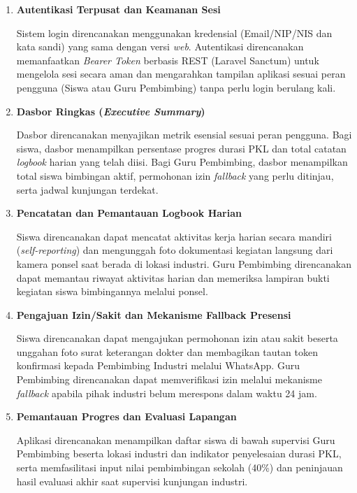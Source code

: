 \begin{enumerate}[label=\alph*.]
\item \textbf{Autentikasi Terpusat dan Keamanan Sesi}
\par\noindent Sistem login direncanakan menggunakan kredensial (Email/NIP/NIS dan kata sandi) yang sama dengan versi \textit{web}. Autentikasi direncanakan memanfaatkan \textit{Bearer Token} berbasis REST (Laravel Sanctum) untuk mengelola sesi secara aman dan mengarahkan tampilan aplikasi sesuai peran pengguna (Siswa atau Guru Pembimbing) tanpa perlu login berulang kali.
\item \textbf{Dasbor Ringkas (\textit{Executive Summary})}
\par\noindent Dasbor direncanakan menyajikan metrik esensial sesuai peran pengguna. Bagi siswa, dasbor menampilkan persentase progres durasi PKL dan total catatan \textit{logbook} harian yang telah diisi. Bagi Guru Pembimbing, dasbor menampilkan total siswa bimbingan aktif, permohonan izin \textit{fallback} yang perlu ditinjau, serta jadwal kunjungan terdekat.
\item \textbf{Pencatatan dan Pemantauan Logbook Harian}
\par\noindent Siswa direncanakan dapat mencatat aktivitas kerja harian secara mandiri (\textit{self-reporting}) dan mengunggah foto dokumentasi kegiatan langsung dari kamera ponsel saat berada di lokasi industri. Guru Pembimbing direncanakan dapat memantau riwayat aktivitas harian dan memeriksa lampiran bukti kegiatan siswa bimbingannya melalui ponsel.
\item \textbf{Pengajuan Izin/Sakit dan Mekanisme Fallback Presensi}
\par\noindent Siswa direncanakan dapat mengajukan permohonan izin atau sakit beserta unggahan foto surat keterangan dokter dan membagikan tautan token konfirmasi kepada Pembimbing Industri melalui WhatsApp. Guru Pembimbing direncanakan dapat memverifikasi izin melalui mekanisme \textit{fallback} apabila pihak industri belum merespons dalam waktu 24 jam.
\item \textbf{Pemantauan Progres dan Evaluasi Lapangan}
\par\noindent Aplikasi direncanakan menampilkan daftar siswa di bawah supervisi Guru Pembimbing beserta lokasi industri dan indikator penyelesaian durasi PKL, serta memfasilitasi input nilai pembimbingan sekolah (40\%) dan peninjauan hasil evaluasi akhir saat supervisi kunjungan industri.
\end{enumerate}

